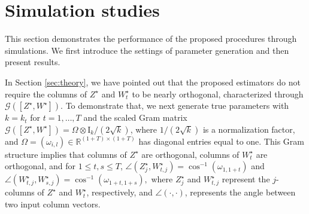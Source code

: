 \documentclass[12pt]{article}
\begin{document}
\section{Simulation studies} \label{sec:simulation}
This section demonstrates the performance of the proposed procedures through simulations. 
We first introduce the settings of  parameter generation and then present results. 



In Section \ref{sec:theory}, we have pointed out that  the proposed estimators do not require the columns of $Z^{\star}$ and $W_t^{\star}$ to be nearly orthogonal, characterized through $\mathcal{G}([Z^{\star}, W^{\star}])$.
To demonstrate that, 
we next generate true parameters with $k=k_t$ for $t=1,\ldots, T$ and the scaled Gram matrix $\mathcal{G}([Z^{\star}, W^{\star}])= \Omega \otimes \mathrm{I}_k/(2\sqrt{k}) $, 
where  $1/(2\sqrt{k})$ is a normalization factor, and  
$\Omega = (\omega_{i,l})\in \mathbb R^{(1+T) \times (1+T)}$ has diagonal entries  equal to one.  
This Gram structure implies that columns of $Z^{\star}$ are orthogonal, columns of $W_t^{\star}$ are orthogonal, and for $1\leqslant t,s\leqslant T$, 
$ \angle (Z_j^{\star}, W_{t,j}^{\star}) = \cos^{-1} (\omega_{1,1+t})$ and $\angle (W_{t,j}^{\star}, W_{s,j}^{\star}) = \cos^{-1} (\omega_{1+t,1+s}),$
where  $Z_j^{\star}$ and $W_{t,j}^{\star}$ represent the $j$-columns of $Z^{\star}$ and $W^{\star}_t$, respectively, and $\angle (\cdot, \cdot)$, represents the angle between two input  column vectors. 
\end{document}
